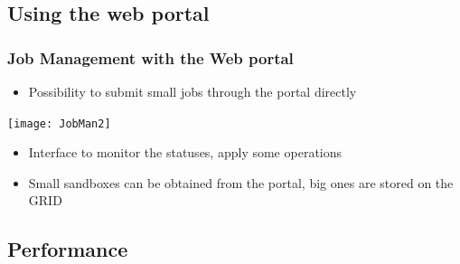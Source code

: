 \documentclass[10pt,table,dvipsnames]{beamer}
\begin{document}
\subsection{Using the web portal}
\label{sec:web}

\begin{frame}
  \frametitle{Job Management with the Web portal}
  \begin{itemize}
  \item Possibility to {\color{NavyBlue}submit small jobs through the portal} directly
\end{itemize}
\centering
\texttt{[image: JobMan2]}~\\
\begin{itemize}
\item Interface to {\color{NavyBlue}monitor the statuses, apply some operations}
\item {\color{NavyBlue}Small sandboxes} can be obtained {\color{NavyBlue}from the portal}, big ones are
  stored on the GRID
\end{itemize}
\end{frame}

\subsection{Performance}
\label{sec:perfs}
\end{document}

